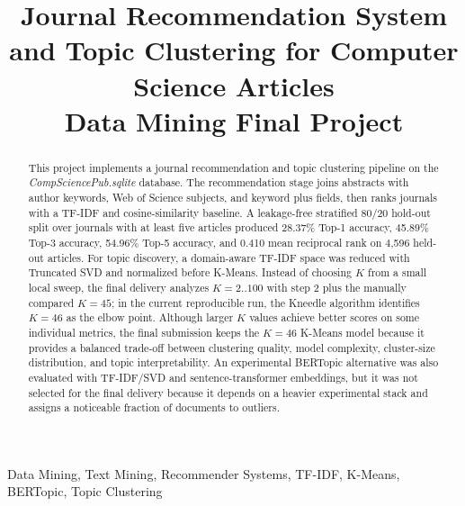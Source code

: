 \documentclass[conference]{IEEEtran}
\begin{document}
\title{Journal Recommendation System and Topic Clustering for Computer Science Articles\\
{\footnotesize Data Mining Final Project}}

\author{
}

\maketitle

\begin{abstract}
This project implements a journal recommendation and topic clustering pipeline on the \textit{CompSciencePub.sqlite} database. The recommendation stage joins abstracts with author keywords, Web of Science subjects, and keyword plus fields, then ranks journals with a TF-IDF and cosine-similarity baseline. A leakage-free stratified 80/20 hold-out split over journals with at least five articles produced 28.37\% Top-1 accuracy, 45.89\% Top-3 accuracy, 54.96\% Top-5 accuracy, and 0.410 mean reciprocal rank on 4,596 held-out articles. For topic discovery, a domain-aware TF-IDF space was reduced with Truncated SVD and normalized before K-Means. Instead of choosing $K$ from a small local sweep, the final delivery analyzes $K=2..100$ with step 2 plus the manually compared $K=45$; in the current reproducible run, the Kneedle algorithm identifies $K=46$ as the elbow point. Although larger $K$ values achieve better scores on some individual metrics, the final submission keeps the $K=46$ K-Means model because it provides a balanced trade-off between clustering quality, model complexity, cluster-size distribution, and topic interpretability. An experimental BERTopic alternative was also evaluated with TF-IDF/SVD and sentence-transformer embeddings, but it was not selected for the final delivery because it depends on a heavier experimental stack and assigns a noticeable fraction of documents to outliers.
\end{abstract}

\begin{IEEEkeywords}
Data Mining, Text Mining, Recommender Systems, TF-IDF, K-Means, BERTopic, Topic Clustering
\end{IEEEkeywords}
\end{document}

